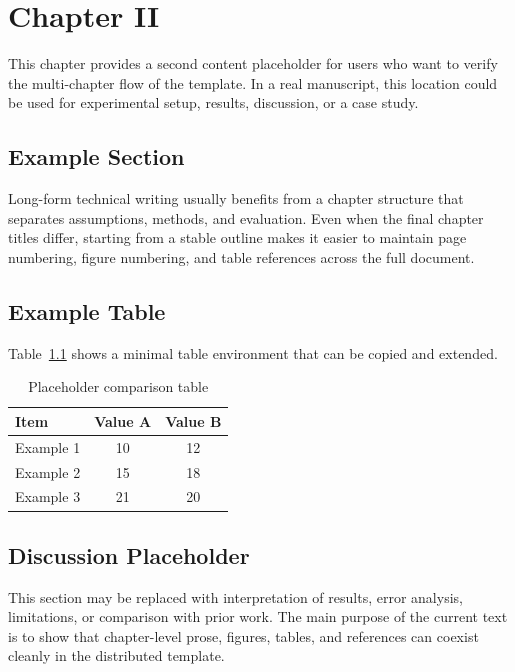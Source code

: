 \chapter{Chapter II}

This chapter provides a second content placeholder for users who want to verify the multi-chapter flow of the template. In a real manuscript, this location could be used for experimental setup, results, discussion, or a case study.

\section{Example Section}

Long-form technical writing usually benefits from a chapter structure that separates assumptions, methods, and evaluation. Even when the final chapter titles differ, starting from a stable outline makes it easier to maintain page numbering, figure numbering, and table references across the full document.

\section{Example Table}

Table~\ref{tab:placeholder} shows a minimal table environment that can be copied and extended.

\begin{table}[t]
    \centering
    \caption{Placeholder comparison table}
    \label{tab:placeholder}
    \begin{tabular}{lcc}
        \hline
        Item & Value A & Value B \\
        \hline
        Example 1 & 10 & 12 \\
        Example 2 & 15 & 18 \\
        Example 3 & 21 & 20 \\
        \hline
    \end{tabular}
\end{table}

\section{Discussion Placeholder}

This section may be replaced with interpretation of results, error analysis, limitations, or comparison with prior work. The main purpose of the current text is to show that chapter-level prose, figures, tables, and references can coexist cleanly in the distributed template.
